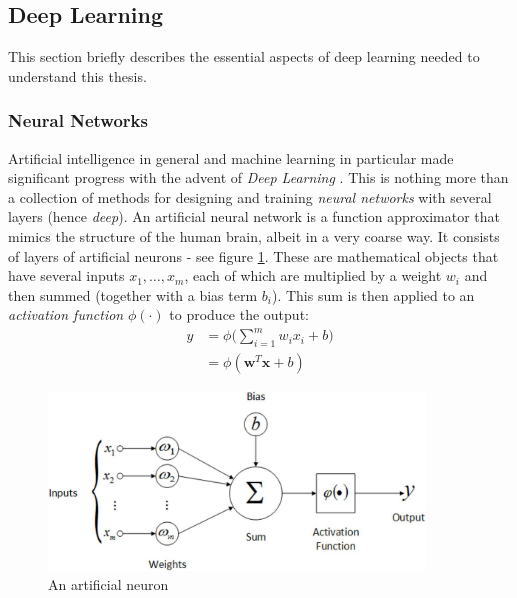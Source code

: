 \subsection{Deep Learning}
This section briefly describes the essential aspects of deep learning needed to understand this thesis.
\label{sec:deep_learning}

\subsubsection{Neural Networks}
Artificial intelligence in general and machine learning in particular made significant progress with the advent of \emph{Deep Learning} \cite{goodfellow2016deep}. This is nothing more than a collection of methods for designing and training \emph{neural networks} with several layers (hence \emph{deep}). An artificial neural network is a function approximator that mimics the structure of the human brain, albeit in a very coarse way. It consists of layers of artificial neurons - see figure \ref{fig:neuron}. These are mathematical objects that have several inputs $x_1, \ldots, x_m$, each of which are multiplied by a weight $w_i$ and then summed (together with a bias term $b_i$). This sum is then applied to an \emph{activation function} $\phi(\cdot)$ to produce the output:
\begin{equation}
    \begin{split}
    y &= \phi \Big (\sum_{i=1}^{m}w_i x_i + b \Big) \\
      &= \phi (\bm{w}^T \bm{x} + b) 
    \end{split}
    \label{eq:neuron}
\end{equation}

\begin{figure}[htp]
    \centering
    \includegraphics[width=10cm]{images/neuron.jpeg}
    \caption{An artificial neuron}
    \label{fig:neuron}
\end{figure}

